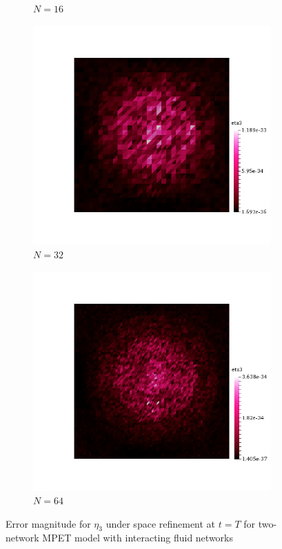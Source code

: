 \begin{figure}[h!]
\begin{subfigure}[b]{0.24\textwidth}
    \caption{$N=16$}
  \end{subfigure}
  \begin{subfigure}[b]{0.24\textwidth}
    \includegraphics[width=\textwidth,height=\textheight,keepaspectratio,height=\textheight,keepaspectratio]{figures/2_mpet/default/space/eta3_32.png}
    \caption{$N=32$}
  \end{subfigure}
  \begin{subfigure}[b]{0.24\textwidth}
    \includegraphics[width=\textwidth,height=\textheight,keepaspectratio,height=\textheight,keepaspectratio]{figures/2_mpet/default/space/eta3_64.png}
    \caption{$N=64$}
  \end{subfigure}
  \caption{Error magnitude for $\eta_3$ under space refinement at $t=T$ for two-network MPET model with interacting fluid networks} \label{fig:bb_default_eta3}
\end{figure}
